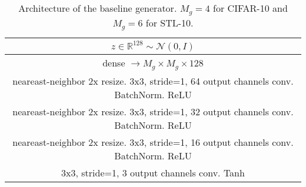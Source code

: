 \documentclass{article} %
\begin{document}
\begin{table}[t]
\caption{Architecture of the baseline generator. $M_g = 4$ for CIFAR-10 and $M_g = 6$ for STL-10.} 
\label{table:baseline_generator}
\begin{center}
\begin{tabular}{c}
\hline
$z \in \mathbb{R}^{128} \sim \mathcal{N}(0,I) $ \\ \hline
dense $\rightarrow M_g \times M_g \times 128$ \\ \hline
neareast-neighbor 2x resize. 3x3, stride=1, 64 output channels conv. BatchNorm. ReLU \\ \hline
neareast-neighbor 2x resize. 3x3, stride=1, 32 output channels conv. BatchNorm. ReLU \\ \hline
neareast-neighbor 2x resize. 3x3, stride=1, 16 output channels conv. BatchNorm. ReLU \\ \hline
3x3, stride=1, 3 output channels conv. Tanh \\ \hline
\end{tabular}
\end{center}
\end{table}
\end{document}
